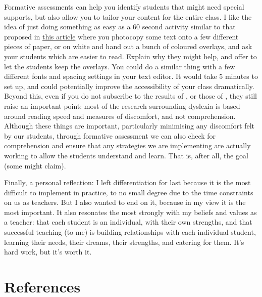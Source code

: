 \documentclass[17pt]{memoir}
\begin{document}
Formative assessments can help you identify students that might need special supports, but also allow you to tailor your content for the entire class. I like the idea of just doing something as easy as a 60 second activity similar to that proposed in \href{https://educationtechnologysolutions.com.au/2015/02/10-achievable-strategies-to-tackle-dyslexia-in-your-classroom-and-school/}{this article} where you photocopy some text onto a few different pieces of paper, or on white and hand out a bunch of coloured overlays, and ask your students which are easier to read. Explain why they might help, and offer to let the students keep the overlays. You could do a similar thing with a few different fonts and spacing settings in your text editor. It would take 5 minutes to set up, and could potentially improve the accessibility of your class dramatically. Beyond this, even if you do not subscribe to the results of  \cite{French2013}, or those of \cite{Henderson2013}, they still raise an important point: most of the research surrounding dyslexia is based around reading speed and measures of discomfort, and not comprehension. Although these things are important, particularly minimising any discomfort felt by our students, through formative assessment we can also check for comprehension and ensure that any strategies we are implementing are actually working to allow the students understand and learn. That is, after all, the goal (some might claim).

Finally, a personal reflection: I left differentiation for last because it is the most difficult to implement in practice, to no small degree due to the time constraints on us as teachers. But I also wanted to end on it, because in my view it is the most important. It also resonates the most strongly with my beliefs and values as a teacher: that each student is an individual, with their own strengths, and that successful teaching (to me) is building relationships with each individual student, learning their needs, their dreams, their strengths, and catering for them. It's hard work, but it's worth it.

\section*{References}
\end{document}
